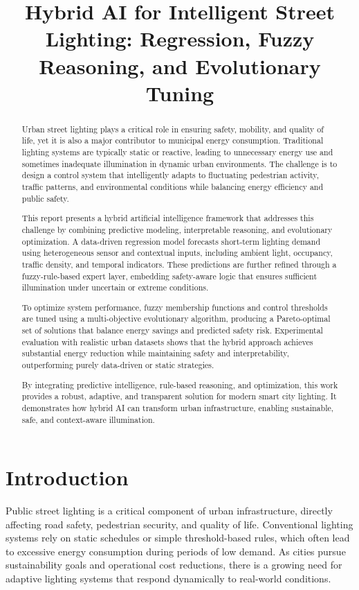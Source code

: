 \documentclass[conference]{IEEEtran}
\title{Hybrid AI for Intelligent Street Lighting: Regression, Fuzzy Reasoning, and Evolutionary Tuning}
\author{
\IEEEauthorblockN{Everyone has done equal amount of work :)\\
Michał Mazurek, Marcin Basisty, Łukasz Święch, Byeongjun Min}
\IEEEauthorblockA{
Faculty of Physics and Applied Computer Science\\
AGH University of Science\\
Krakow, Poland\\
}
}
\begin{document}
\maketitle
\begin{abstract}
Urban street lighting plays a critical role in ensuring safety, mobility, and quality of life, yet it is also a major contributor to municipal energy consumption. Traditional lighting systems are typically static or reactive, leading to unnecessary energy use and sometimes inadequate illumination in dynamic urban environments. The challenge is to design a control system that intelligently adapts to fluctuating pedestrian activity, traffic patterns, and environmental conditions while balancing energy efficiency and public safety.

This report presents a hybrid artificial intelligence framework that addresses this challenge by combining predictive modeling, interpretable reasoning, and evolutionary optimization. A data-driven regression model forecasts short-term lighting demand using heterogeneous sensor and contextual inputs, including ambient light, occupancy, traffic density, and temporal indicators. These predictions are further refined through a fuzzy-rule-based expert layer, embedding safety-aware logic that ensures sufficient illumination under uncertain or extreme conditions.

To optimize system performance, fuzzy membership functions and control thresholds are tuned using a multi-objective evolutionary algorithm, producing a Pareto-optimal set of solutions that balance energy savings and predicted safety risk. Experimental evaluation with realistic urban datasets shows that the hybrid approach achieves substantial energy reduction while maintaining safety and interpretability, outperforming purely data-driven or static strategies.

By integrating predictive intelligence, rule-based reasoning, and optimization, this work provides a robust, adaptive, and transparent solution for modern smart city lighting. It demonstrates how hybrid AI can transform urban infrastructure, enabling sustainable, safe, and context-aware illumination.
\end{abstract}

\section{Introduction}
Public street lighting is a critical component of urban infrastructure, directly affecting road safety, pedestrian security, and quality of life. Conventional lighting systems rely on static schedules or simple threshold-based rules, which often lead to excessive energy consumption during periods of low demand. As cities pursue sustainability goals and operational cost reductions, there is a growing need for adaptive lighting systems that respond dynamically to real-world conditions.
\end{document}
